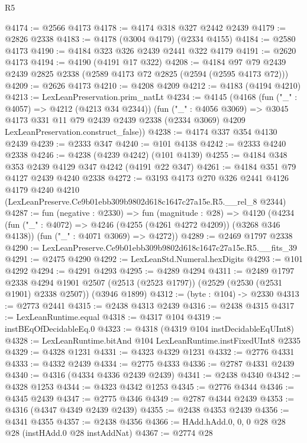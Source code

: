 \begin{lexlean}{R5}
\begin{coremodule}
@4174 := @2566 @4173
@4178 := @4174 @318 @327 @2442 @2439
@4179 := @2826 @2338
@4183 := @4178 (@3004 @4179) (@2334 @4155)
@4184 := @2580 @4173
@4190 := @4184 @323 @326 @2439 @2441 @322 @4179
@4191 := @2620 @4173
@4194 := @4190 (@4191 @17 @322)
@4208 := @4184 @97 @79 @2439 @2439 @2825 @2338 (@2589 @4173 @72 @2825 (@2594 (@2595 @4173 @72)))
@4209 := @2626 @4173
@4210 := @4208 @4209
@4212 := @4183 (@4194 @4210)
@4213 := LexLeanPreservation.prim_natLt
@4234 := @4145
    (@4168
      (fun ("_" : @4057) => @4212 (@4213 @34 @2344))
      (fun ("_" : @4056 @3069) =>
      @3045
        @4173
        @331
        @11
        @79
        @2439
        @2439
        @2338
        (@2334 @3069)
        @4209
        LexLeanPreservation.construct_false))
@4238 := @4174 @337 @354 @4130 @2439
@4239 := @2333 @347
@4240 := @101 @4138
@4242 := @2333 @4240 @2338
@4246 := @4238 (@4239 @4242) (@101 @4139)
@4255 := @4184 @348 @353 @2439 @4129 @347 @4242 (@4191 @22 @347)
@4261 := @4184 @351 @79 @4127 @2439 @4240 @2338
@4272 := @3193
    @4173
    @270
    @326
    @2441
    @4126
    @4179
    @4240
    @4210
    (LexLeanPreserve.Ce9b01ebb309b9802d618c1647c27a15e.R5.__rel_8 @2344)
@4287 := fun (negative : @2330) =>
  fun (magnitude : @28) =>
  @4120
    (@4234
      (fun ("_" : @4072) => @4246 (@4255 (@4261 @4272 @4209)) (@3268 @346 @4138))
      (fun ("_" : @4071 @3069) => @4272))
@4289 := @2469 @1797 @2338
@4290 := LexLeanPreserve.Ce9b01ebb309b9802d618c1647c27a15e.R5.__fits_39
@4291 := @2475 @4290
@4292 := LexLeanStd.Numeral.hexDigits
@4293 := @101 @4292
@4294 := @4291 @4293
@4295 := @4289 @4294
@4311 := @2489
    @1797
    @2338
    @4294
    @1901
    @2507
    (@2513 (@2523 @1797))
    (@2529 (@2530 (@2531 @1901) @2338 @2507))
    (@3946 @1899)
@4312 := (byte : @104) -> @2330
@4313 := @2773 @2441
@4315 := @2438 @4313 @2439
@4316 := @2438 @4315
@4317 := LexLeanRuntime.equal
@4318 := @4317 @104
@4319 := instBEqOfDecidableEq.{0}
@4323 := @4318 (@4319 @104 instDecidableEqUInt8)
@4328 := LexLeanRuntime.bitAnd @104 LexLeanRuntime.instFixedUInt8 @2335
@4329 := @4328 @1231
@4331 := @4323 @4329 @1231
@4332 := @2776 @4331
@4333 := @4332 @2439
@4334 := @2775 @4333
@4336 := @2787 @4331 @2439
@4340 := @4316 (@4334 @4336 @2439 @2439)
@4341 := @2438 @4340
@4342 := @4328 @1253
@4344 := @4323 @4342 @1253
@4345 := @2776 @4344
@4346 := @4345 @2439
@4347 := @2775 @4346
@4349 := @2787 @4344 @2439
@4353 := @4316 (@4347 @4349 @2439 @2439)
@4355 := @2438 @4353 @2439
@4356 := @4341 @4355
@4357 := @2438 @4356
@4366 := HAdd.hAdd.{0, 0, 0} @28 @28 @28 (instHAdd.{0} @28 instAddNat)
@4367 := @2774 @28

\end{coremodule}
\end{lexlean}
